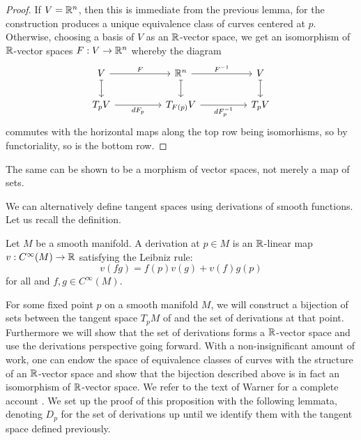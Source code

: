 \begin{proof}
    If $V=\mathbb{R}^{n}$, then this is immediate from the previous lemma, for the construction produces a unique equivalence class of curves centered at $p$. Otherwise, choosing a basis of $V$ as an $\mathbb{R}$-vector space, we get an isomorphism of $\mathbb{R}$-vector spaces $F:V\to\mathbb{R}^{n}$ whereby the diagram 
    $$%
    \begin{tikzcd}
        V && {\RR^{n}} && V \\
        {T_{p}V} && {T_{F(p)}V} && {T_{p}V}
        \arrow["F", from=1-1, to=1-3]
        \arrow[maps to, from=1-1, to=2-1]
        \arrow["{F^{-1}}", from=1-3, to=1-5]
        \arrow[maps to, from=1-3, to=2-3]
        \arrow[maps to, from=1-5, to=2-5]
        \arrow["{dF_{p}}"', from=2-1, to=2-3]
        \arrow["{dF^{-1}_{p}}"', from=2-3, to=2-5]
    \end{tikzcd}$$
    commutes with the horizontal maps along the top row being isomorhisms, so by functoriality, so is the bottom row.  
\end{proof}
\begin{remark}
    The same can be shown to be a morphism of vector spaces, not merely a map of sets. 
\end{remark}
We can alternatively define tangent spaces using derivations of smooth functions. Let us recall the definition. 
\begin{definition}[Derivation]\label{def: derivation}
    Let $M$ be a smooth manifold. A derivation at $p\in M$ is an $\mathbb{R}$-linear map $v:C^{\infty}(M)\to\mathbb{R}$ satisfying the Leibniz rule:
    $$v(fg)=f(p)v(g)+v(f)g(p)$$
    for all and $f,g\in C^{\infty}(M)$. 
\end{definition}
For some fixed point $p$ on a smooth manifold $M$, we will construct a bijection of sets between the tangent space $T_{p}M$ of  and the set of derivations at that point. Furthermore we will show that the set of derivations forms a $\mathbb{R}$-vector space and use the derivations perspective going forward. With a non-insignificant amount of work, one can endow the space of equivalence classes of curves with the structure of an $\mathbb{R}$-vector space and show that the bijection described above is in fact an isomorphism of $\mathbb{R}$-vector space. We refer to the text of Warner for a complete account \cite{Warner}. We set up the proof of this proposition with the following lemmata, denoting $D_{p}$ for the set of derivations up until we identify them with the tangent space defined previously. 
